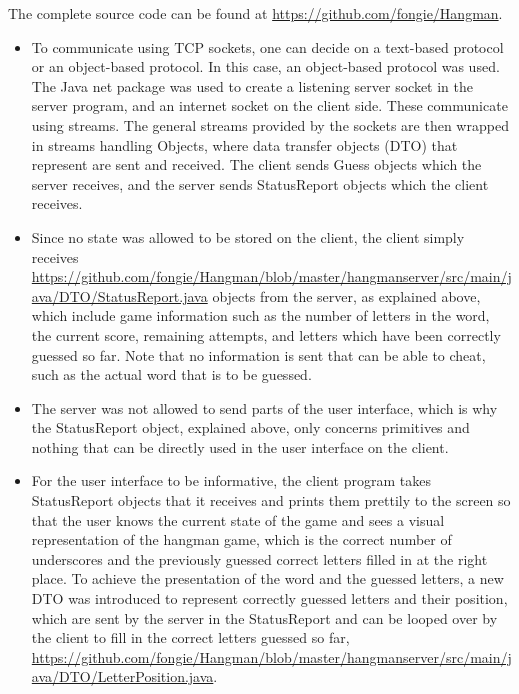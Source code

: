 \documentclass[a4paper]{scrartcl}
\begin{document}
\noindent The complete source code can be found at \href{https://github.com/fongie/Hangman}{https://github.com/fongie/Hangman}.

\begin{itemize}
    \item To communicate using TCP sockets, one can decide on a text-based protocol or an object-based protocol. In this case, an object-based protocol was used. The Java net package was used to create a listening server socket in the server program, and an internet socket on the client side. These communicate using streams. The general streams provided by the sockets are then wrapped in streams handling Objects, where data transfer objects (DTO) that represent are sent and received. The client sends Guess objects which the server receives, and the server sends StatusReport objects which the client receives.
    \item Since no state was allowed to be stored on the client, the client simply receives \href{StatusReport}{https://github.com/fongie/Hangman/blob/master/hangmanserver/src/main/java/DTO/StatusReport.java} objects from the server, as explained above, which include game information such as the number of letters in the word, the current score, remaining attempts, and letters which have been correctly guessed so far. Note that no information is sent that can be able to cheat, such as the actual word that is to be guessed.
    \item The server was not allowed to send parts of the user interface, which is why the StatusReport object, explained above, only concerns primitives and nothing that can be directly used in the user interface on the client.
    \item For the user interface to be informative, the client program takes StatusReport objects that it receives and prints them prettily to the screen so that the user knows the current state of the game and sees a visual representation of the hangman game, which is the correct number of underscores and the previously guessed correct letters filled in at the right place. To achieve the presentation of the word and the guessed letters, a new DTO was introduced to represent correctly guessed letters and their position, which are sent by the server in the StatusReport and can be looped over by the client to fill in the correct letters guessed so far, \href{LetterPosition}{https://github.com/fongie/Hangman/blob/master/hangmanserver/src/main/java/DTO/LetterPosition.java}.

\end{itemize}
\end{document}
